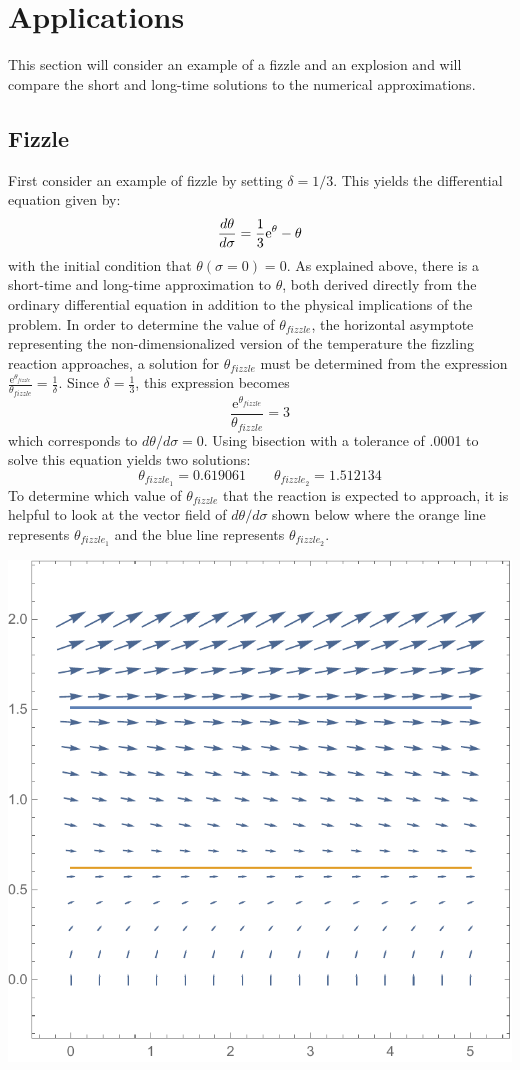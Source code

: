 \documentclass{article}
\begin{document}
\section*{Applications}
This section will consider an example of a fizzle and an explosion and will compare the short and long-time solutions to the numerical approximations.
\subsection*{Fizzle}
First consider an example of fizzle by setting $\delta = 1/3$.  This yields the differential equation given by:
$$\frac{d\theta}{d\sigma} = \frac{1}{3}\text{e}^\theta - \theta\\$$
with the initial condition that $\theta(\sigma = 0) = 0$.  As explained above, there is a short-time and long-time approximation to $\theta$, both derived directly from the ordinary differential equation in addition to the physical implications of the problem.  In order to determine the value of $\theta_{fizzle}$, the horizontal asymptote representing the non-dimensionalized version of the temperature the fizzling reaction approaches, a solution for $\theta_{fizzle}$ must be determined from the expression $\frac{\text{e}^{\theta_{fizzle}}}{\theta_{fizzle}} = \frac{1}{\delta}$. Since $\delta = \frac{1}{3}$, this expression becomes $$\frac{\text{e}^{\theta_{fizzle}}}{\theta_{fizzle}} = 3 $$ which corresponds to $d\theta/d\sigma = 0$.  Using bisection with a tolerance of .0001 to solve this equation yields two solutions:
\begin{equation*}
    \theta_{fizzle_1} = 0.619061  \quad  \quad \theta_{fizzle_2} = 1.512134
\end{equation*}
To determine which value of $\theta_{fizzle}$ that the reaction is expected to approach, it is helpful to look at the vector field of $d\theta/d\sigma$ shown below where the orange line represents $\theta_{fizzle_1}$ and the blue line represents $\theta_{fizzle_2}$.
\begin{center}
\includegraphics[scale = .3]{vfield}
\end{center}
\end{document}
